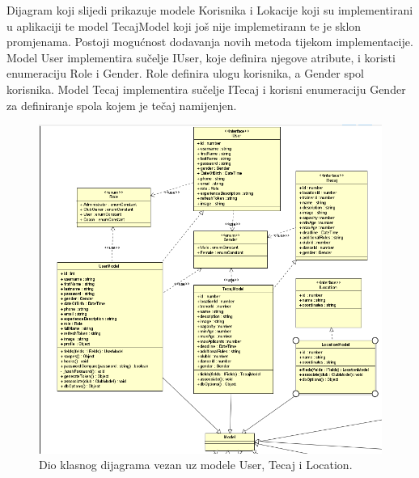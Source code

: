 			Dijagram koji slijedi prikazuje modele Korisnika i Lokacije koji su implementirani u aplikaciji te 
			model TecajModel koji još nije implemetirann te je sklon promjenama. Postoji mogućnost dodavanja novih metoda tijekom implementacije.
			Model User implementira sučelje IUser, koje definira njegove atribute, i koristi enumeraciju Role i Gender. Role definira ulogu korisnika, a
			Gender spol korisnika. Model Tecaj implementira sučelje ITecaj i korisni enumeraciju Gender za definiranje spola kojem je tečaj namijenjen.
			\\
			\begin{figure}[H]
				\includegraphics[scale=1.0]{slike/class1.png}
				\centering
				\caption{Dio klasnog dijagrama vezan uz modele User, Tecaj i Location.}
				\label{fig:class1}
			\end{figure}
			
